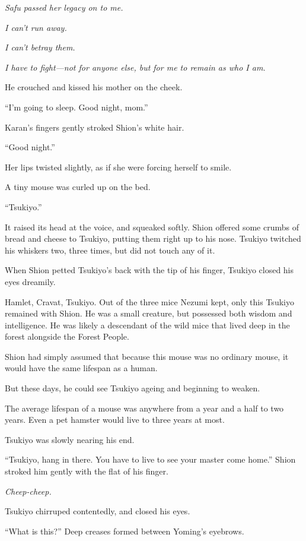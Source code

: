 \emph{Safu passed her legacy on to me.}

\emph{I can't run away.}

\emph{I can't betray them.}

\emph{I have to fight---not for anyone else, but for me to remain as who I am.}

He crouched and kissed his mother on the cheek.

``I'm going to sleep. Good night, mom.''

Karan's fingers gently stroked Shion's white hair.

``Good night.''

Her lips twisted slightly, as if she were forcing herself to smile.

\mybreak

A tiny mouse was curled up on the bed.

``Tsukiyo.''

It raised its head at the voice, and squeaked softly. Shion offered some
crumbs of bread and cheese to Tsukiyo, putting them right up to his
nose. Tsukiyo twitched his whiskers two, three times, but did not touch
any of it.

When Shion petted Tsukiyo's back with the tip of his finger,
Tsukiyo closed his eyes dreamily.

Hamlet, Cravat, Tsukiyo. Out of the three mice Nezumi kept, only this
Tsukiyo remained with Shion. He was a small creature, but possessed both
wisdom and intelligence. He was likely a descendant of the wild mice
that lived deep in the forest alongside the Forest People.

Shion had simply assumed that because this mouse was no ordinary mouse,
it would have the same lifespan as a human.

But these days, he could see Tsukiyo ageing and beginning to weaken.

The average lifespan of a mouse was anywhere from a year and a half to
two years. Even a pet hamster would live to three years at most.

Tsukiyo was slowly nearing his end.

``Tsukiyo, hang in there. You have to live to see your master come
home.'' Shion stroked him gently with the flat of his finger.

\emph{Cheep-cheep.}

Tsukiyo chirruped contentedly, and closed his eyes.

\mybreak

``What is this?'' Deep creases formed between Yoming's eyebrows.


